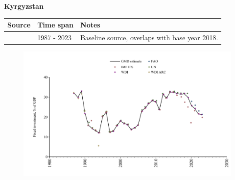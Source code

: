 \documentclass[12pt,a4paper,landscape]{article}
\begin{document}
\begin{adjustbox}{max totalsize={\paperwidth}{\paperheight},center}
\begin{minipage}[t][\textheight][t]{\textwidth}
\vspace*{0.5cm}
{}
\begin{center}
{\Large\bfseries Kyrgyzstan}
\end{center}
\vspace{0.5cm}
\begin{table}[H]
\centering
\small
\begin{tabular}{|l|l|l|}
\hline
\textbf{Source} & \textbf{Time span} & \textbf{Notes} \\
\hline
\rowcolor{white}\cite{WDI}& 1987 - 2023 &Baseline source, overlaps with base year 2018.\\
\hline
\end{tabular}
\end{table}
\begin{figure}[H]
\centering
\includegraphics[width=\textwidth,height=0.6\textheight,keepaspectratio]{graphs/KGZ_finv_GDP.pdf}
\end{figure}
\end{minipage}
\end{adjustbox}
\end{document}
